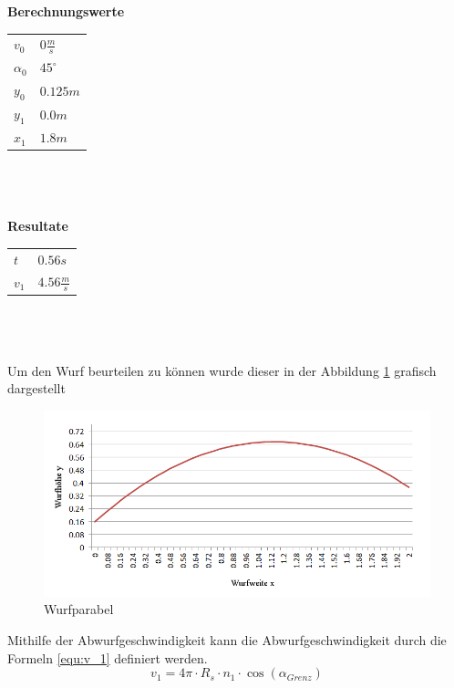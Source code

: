 \textbf{Berechnungswerte}\\
\begin{tabular}{ll}
	\rule{0pt}{11pt} $v_0$ & $0 \frac{m}{s}$ \\
	\rule{0pt}{11pt} $\alpha_0$ & $45^\circ$ \\
	\rule{0pt}{11pt} $y_0$ & $0.125 m$ \\
	\rule{0pt}{11pt} $y_1$ & $0.0 m$ \\
	\rule{0pt}{11pt} $x_1$ & $1.8 m$ \\
\end{tabular}\\
\\
\\
\textbf{Resultate}\\
\begin{tabular}{ll}
	\rule{0pt}{11pt} $t$ & $0.56 s$ \\
	\rule{0pt}{11pt} $v_1$ & $4.56 \frac{m}{s}$ \\
\end{tabular}\\
\\
\\
Um den Wurf beurteilen zu können wurde dieser in der Abbildung \ref{fig:Wurfparabel} 
grafisch dargestellt
\begin{figure}[h!]
	\centering
	\includegraphics[width=1\textwidth,clip,trim=7mm 7mm 7mm 0mm]
	{Enddokumentation/Anhang/Bilder/Schiefer_Wurf.jpg}
	\caption{Wurfparabel}
	\label{fig:Wurfparabel}
\end{figure}
Mithilfe der Abwurfgeschwindigkeit kann die Abwurfgeschwindigkeit durch die Formeln 
\ref{equ:v_1} definiert werden.
\begin{equation}  
    v_1 = 4\pi \cdot R_s \cdot n_1 \cdot \cos(\alpha_{Grenz})
    \label{equ:v_1}
\end{equation}

